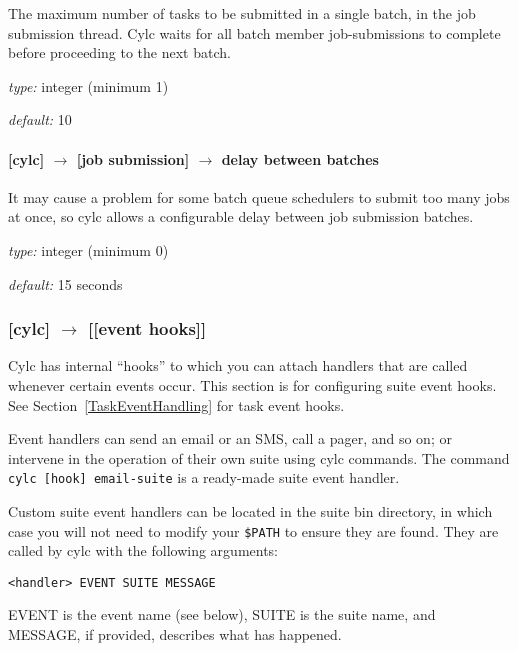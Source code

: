 The maximum number of tasks to be submitted in a single batch, in the
job submission thread. Cylc waits for all batch member job-submissions
to complete before proceeding to the next batch.

\begin{myitemize}
    \item {\em type:} integer (minimum 1)
    \item {\em default:} 10
\end{myitemize}

\paragraph[delay between batches]{[cylc] $\rightarrow$ [job submission] $\rightarrow$ delay between batches}

It may cause a problem for some batch queue schedulers to submit too
many jobs at once, so cylc allows a configurable delay between job 
submission batches.

\begin{myitemize}
    \item {\em type:} integer (minimum 0)
    \item {\em default:} 15 seconds
\end{myitemize}

\subsubsection[{[[}event hooks{]]}]{[cylc] $\rightarrow$ [[event hooks]]}
\label{SuiteEventHandling}

Cylc has internal ``hooks'' to which you can attach handlers that are 
called whenever certain events occur. This section is for configuring suite
event hooks. See Section~\ref{TaskEventHandling} for task event hooks.

Event handlers can send an email or an SMS, call a pager, and so on; or
intervene in the operation of their own suite using cylc commands. 
The command \lstinline=cylc [hook] email-suite= is a ready-made suite
event handler.

Custom suite event handlers can be located in the suite bin directory,  
in which case you will not need to modify your \lstinline=$PATH= to ensure
they are found.  They are called by cylc with the following arguments:
\begin{lstlisting}
<handler> EVENT SUITE MESSAGE
\end{lstlisting}
EVENT is the event name (see below), SUITE is the suite name, and 
MESSAGE, if provided, describes what has happened.


